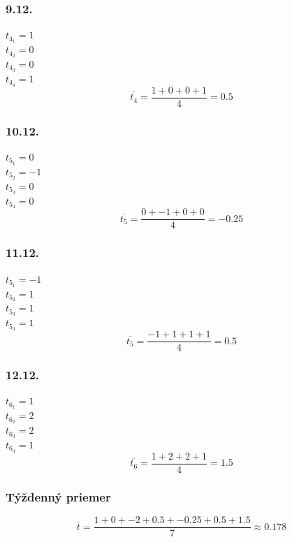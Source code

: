 \documentclass{article}
\begin{document}
\subsubsection{9.12.}
	$t_{4_1} = 1$\\
	$t_{4_2} = 0$\\
	$t_{4_3} = 0$\\
	$t_{4_4}=1$\\
	\[
		\overline{t_4}=\frac{1+0+0+1}{4}=0.5
	\]
\subsubsection{10.12.}
	$t_{5_1} = 0$\\
	$t_{5_2} = -1$\\
	$t_{5_3} = 0$\\
	$t_{5_4}=0$\\
	\[
		\overline{t_5}=\frac{0+-1+0+0}{4}=-0.25
	\]
\subsubsection{11.12.}
	$t_{5_1} = -1$\\
	$t_{5_2} = 1$\\
	$t_{5_3} = 1$\\
	$t_{5_4}=1$\\
	\[
		\overline{t_5}=\frac{-1+1+1+1}{4}=0.5
	\]
\subsubsection{12.12.}
	$t_{6_1} = 1$\\
	$t_{6_2} = 2$\\
	$t_{6_3} = 2$\\
	$t_{6_4}= 1$\\
	\[
		\overline{t_6}=\frac{1+2+2+1}{4}=1.5
	\]

\subsubsection{Týždenný priemer}
\begin{equation}
	\overline{t}=\frac{1+0+-2+0.5+-0.25+0.5+1.5}{7}\approx0.178
\end{equation}
\newpage
\end{document}
